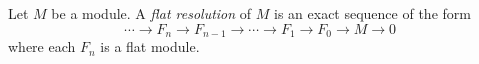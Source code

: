 \documentclass{article}
\begin{document}
Let $M$ be a module.  A {\it flat resolution} of $M$
is an exact sequence of the form
$$\cdots \to F_n \to F_{n-1} \to \cdots \to F_1 \to F_0 \to M \to 0$$
where each $F_n$ is a flat module.
\end{document}
